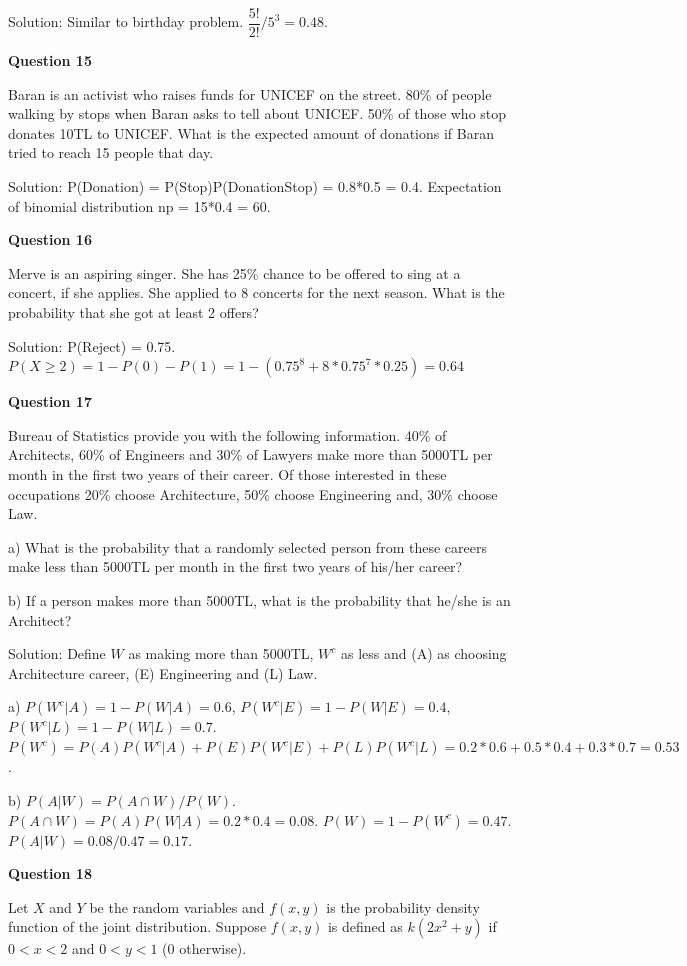 \documentclass[]{book}
\theoremstyle{definition}
\theoremstyle{definition}
\theoremstyle{definition}
\theoremstyle{remark}
\begin{document}
Solution: Similar to birthday problem. \(\dfrac{5!}{2!}/5^3 = 0.48\).

\textbf{Question 15}

Baran is an activist who raises funds for UNICEF on the street. 80\% of
people walking by stops when Baran asks to tell about UNICEF. 50\% of
those who stop donates 10TL to UNICEF. What is the expected amount of
donations if Baran tried to reach 15 people that day.

Solution: P(Donation) = P(Stop)P(Donation\textbar{}Stop) = 0.8*0.5 =
0.4. Expectation of binomial distribution np = 15*0.4 = 60.

\textbf{Question 16}

Merve is an aspiring singer. She has 25\% chance to be offered to sing
at a concert, if she applies. She applied to 8 concerts for the next
season. What is the probability that she got at least 2 offers?

Solution: P(Reject) = 0.75.
\(P(X \ge 2) = 1 - P(0) - P(1) = 1 - (0.75^8 + 8*0.75^7*0.25) = 0.64\)

\textbf{Question 17}

Bureau of Statistics provide you with the following information. 40\% of
Architects, 60\% of Engineers and 30\% of Lawyers make more than 5000TL
per month in the first two years of their career. Of those interested in
these occupations 20\% choose Architecture, 50\% choose Engineering and,
30\% choose Law.

a) What is the probability that a randomly selected person from these
careers make less than 5000TL per month in the first two years of
his/her career?

b) If a person makes more than 5000TL, what is the probability that
he/she is an Architect?

Solution: Define \(W\) as making more than 5000TL, \(W^c\) as less and
(A) as choosing Architecture career, (E) Engineering and (L) Law.

a) \(P(W^c|A) = 1 - P(W|A) = 0.6\), \(P(W^c|E) = 1 - P(W|E) = 0.4\),
\(P(W^c|L) = 1 - P(W|L) = 0.7\).
\(P(W^c) = P(A)P(W^c|A)+P(E)P(W^c|E)+P(L)P(W^c|L) = 0.2*0.6+0.5*0.4+0.3*0.7 = 0.53\).

b) \(P(A|W) = P(A \cap W)/P(W)\).
\(P(A \cap W) = P(A)P(W|A) = 0.2*0.4 = 0.08\).
\(P(W) = 1 - P(W^c) = 0.47\). \(P(A|W) = 0.08/0.47 = 0.17\).

\textbf{Question 18}

Let \(X\) and \(Y\) be the random variables and \(f(x,y)\) is the
probability density function of the joint distribution. Suppose
\(f(x,y)\) is defined as \(k(2x^2 + y)\) if \(0<x<2\) and \(0<y<1\) (0
otherwise).
\end{document}
